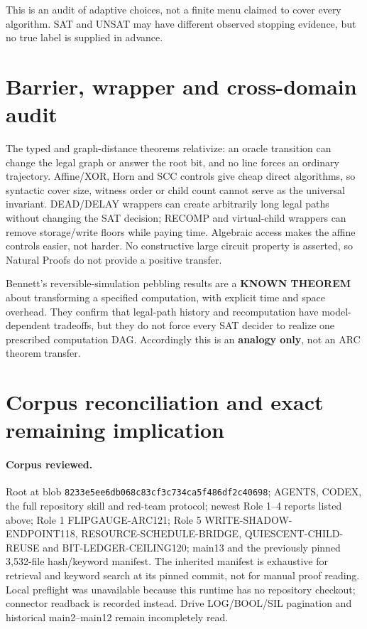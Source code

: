 \documentclass[11pt]{article}
\begin{document}
This is an audit of adaptive choices, not a finite menu claimed to cover every
algorithm.  SAT and UNSAT may have different observed stopping evidence, but
no true label is supplied in advance.

\section{Barrier, wrapper and cross-domain audit}

The typed and graph-distance theorems relativize: an oracle transition can
change the legal graph or answer the root bit, and no line forces an ordinary
trajectory.  Affine/XOR, Horn and SCC controls give cheap direct algorithms,
so syntactic cover size, witness order or child count cannot serve as the
universal invariant.  DEAD/DELAY wrappers can create arbitrarily long legal
paths without changing the SAT decision; RECOMP and virtual-child wrappers
can remove storage/write floors while paying time.  Algebraic access makes
the affine controls easier, not harder.  No constructive large circuit
property is asserted, so Natural Proofs do not provide a positive transfer.

Bennett's reversible-simulation pebbling results are a
\textbf{KNOWN THEOREM} about transforming a specified computation, with
explicit time and space overhead.  They confirm that legal-path history and
recomputation have model-dependent tradeoffs, but they do not force every
SAT decider to realize one prescribed computation DAG.  Accordingly this is
an \textbf{analogy only}, not an ARC theorem transfer.

\section{Corpus reconciliation and exact remaining implication}

\paragraph{Corpus reviewed.}
Root  at blob
\texttt{8233e5ee6db068c83cf3c734ca5f486df2c40698}; AGENTS, CODEX, the full
repository skill and red-team protocol; newest Role 1--4 reports listed
above; Role 1 FLIPGAUGE-ARC121; Role 5 WRITE-SHADOW-ENDPOINT118,
RESOURCE-SCHEDULE-BRIDGE, QUIESCENT-CHILD-REUSE and
BIT-LEDGER-CEILING120; main13 and the previously pinned 3,532-file
hash/keyword manifest.  The inherited manifest is exhaustive for retrieval
and keyword search at its pinned commit, not for manual proof reading.
Local preflight was unavailable because this runtime has no repository
checkout; connector readback is recorded instead.  Drive LOG/BOOL/SIL
pagination and historical main2--main12 remain incompletely read.
\end{document}
